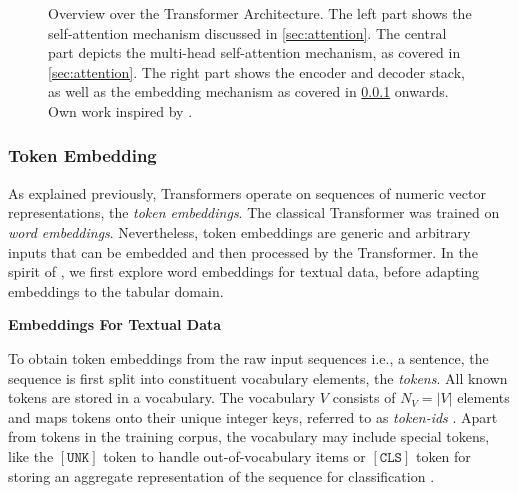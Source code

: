 \begin{landscape}
    \begin{figure}[ht]
        \centering
        {\renewcommand\normalsize{\scriptsize}%
            \normalsize
            }
        \caption[Overview Over the Transformer Architecture]{Overview over the Transformer Architecture. The left part shows the self-attention mechanism discussed in \cref{sec:attention}. The central part depicts the multi-head self-attention mechanism, as covered in \cref{sec:attention}. The right part shows the encoder and decoder stack, as well as the \gls{embedding} mechanism as covered in \cref{sec:token-embeddings} onwards. Own work inspired by \textcite[][3]{tayEfficientTransformersSurvey2022}.}
        \label{fig:transformer-architecture-overview}
    \end{figure}
\end{landscape}

\subsubsection{Token Embedding}\label{sec:token-embeddings}

As explained previously, Transformers operate on sequences of numeric vector representations, the \emph{token embeddings}. The classical Transformer was trained on \emph{word embeddings}. Nevertheless, \gls{token} embeddings are generic and arbitrary inputs that can be embedded and then processed by the Transformer. In the spirit of \textcite[][5]{vaswaniAttentionAllYou2017}, we first explore word embeddings for textual data, before adapting embeddings to the tabular domain.

\textbf{Embeddings For Textual Data}

To obtain \gls{token} embeddings from the raw input sequences i.e., a sentence, the sequence is first split into constituent vocabulary elements, the \emph{tokens}. All known \glspl{token} are stored in a vocabulary. The vocabulary $V$ consists of $N_{V}=|V|$ elements and maps \glspl{token} onto their unique integer keys, referred to as \emph{token-ids} \autocite[][3]{phuongFormalAlgorithmsTransformers2022}. Apart from \glspl{token} in the training corpus, the vocabulary may include special \glspl{token}, like the $\mathtt{[UNK]}$ \gls{token} to handle out-of-vocabulary items or $\mathtt{[CLS]}$ \gls{token} for storing an aggregate representation of the sequence for classification \autocite[cp.][4]{devlinBERTPretrainingDeep2019}.

